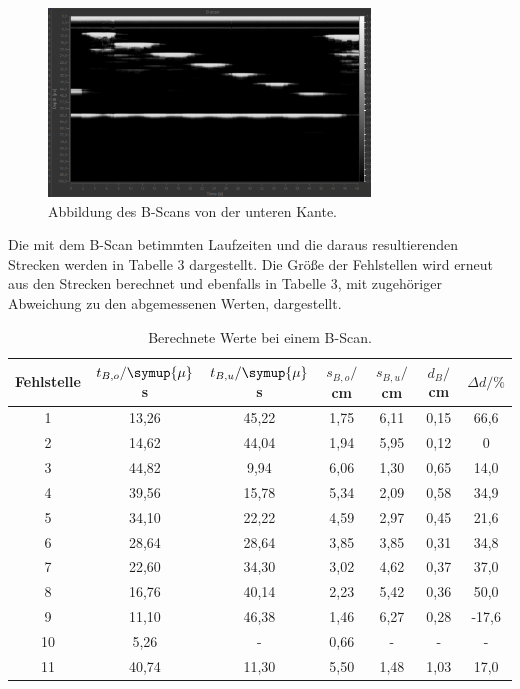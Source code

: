 \begin{figure}[H]
  \centering
  \includegraphics[height=5cm]{B-Scanunten.PNG}
  \caption{Abbildung des B-Scans von der unteren Kante.}
  \label{fig:acryl}
\end{figure}

Die mit dem B-Scan betimmten Laufzeiten und die daraus resultierenden Strecken werden in Tabelle 3 dargestellt.
Die Größe der Fehlstellen wird erneut aus den Strecken berechnet und ebenfalls in Tabelle 3, mit zugehöriger Abweichung
zu den abgemessenen Werten, dargestellt.

\begin{table}[H]
  \centering
  \caption{Berechnete Werte bei einem B-Scan.}
  \label{tab:spannung1}
  \begin{tabular}{c c c c c c c}
    \toprule
  Fehlstelle & $t_{B,o}/\symup{\mu}$s & $t_{B,u}/ \symup{\mu}$s  & $s_{B,o}/$cm & $s_{B,u}/$cm & $d_B/$cm & $\Delta d/ \%$\\
    \midrule
    1  & 13,26 &  45,22 & 1,75 & 6,11  & 0,15 & 66,6      \\
    2  & 14,62 &  44,04 & 1,94 & 5,95  & 0,12 & 0  \\
    3  & 44,82 &  9,94  & 6,06 & 1,30  & 0,65 & 14,0  \\
    4  & 39,56 &  15,78 & 5,34 & 2,09  & 0,58 & 34,9  \\
    5  & 34,10 &  22,22 & 4,59 & 2,97  & 0,45 & 21,6   \\
    6  & 28,64 &  28,64 & 3,85 & 3,85  & 0,31 & 34,8   \\
    7  & 22,60 &  34,30 & 3,02 & 4,62  & 0,37 & 37,0   \\
    8  & 16,76 &  40,14 & 2,23 & 5,42  & 0,36 & 50,0    \\
    9  & 11,10 &  46,38 & 1,46 & 6,27  & 0,28 & -17,6    \\
    10 & 5,26  &  -     &  0,66 & -    & -    &  -      \\
    11 & 40,74 &  11,30 &  5,50 & 1,48 & 1,03 & 17,0   \\
    \bottomrule
  \end{tabular}
\end{table}



